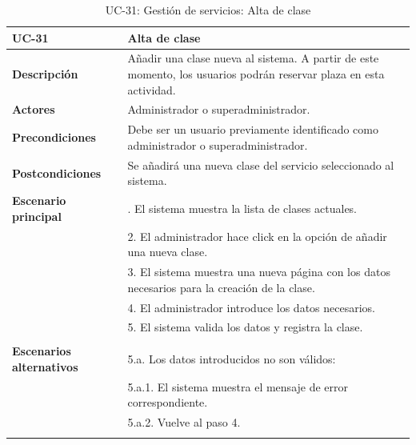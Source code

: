 \begin{table}
  \begin{center}
    \begin{tabularx}{16.4cm}{|l|X|}
      \hline
      \textbf{UC-31} & \textbf{Alta de clase}\\
      \hline
      \textbf{Descripción} & Añadir una clase nueva al sistema. A partir de este momento, los usuarios podrán reservar plaza en esta actividad.\\
      \hline
      \textbf{Actores} & Administrador o superadministrador.\\
      \hline
      \textbf{Precondiciones} & Debe ser un usuario previamente identificado como administrador o superadministrador.\\
      \hline
      \textbf{Postcondiciones} & Se añadirá una nueva clase del servicio seleccionado al sistema.\\
      \hline
      \textbf{Escenario principal} & \smallskip 1. El sistema muestra la lista de clases actuales.\\
      & 2. El administrador hace click en la opción de añadir una nueva clase.\\
      & 3. El sistema muestra una nueva página con los datos necesarios para la creación de la clase.\\
      & 4. El administrador introduce los datos necesarios.\\
      & 5. El sistema valida los datos y registra la clase.\\
      & \\
      \hline
      \textbf{Escenarios alternativos} & \smallskip 5.a. Los datos introducidos no son válidos:\\
      & \hspace{0.3cm} 5.a.1. El sistema muestra el mensaje de error correspondiente.\\
      & \hspace{0.3cm} 5.a.2. Vuelve al paso 4.\\
      & \\
      \hline
    \end{tabularx}
    \caption{UC-31: Gestión de servicios: Alta de clase}
    \label{tab:CU-alta-clase}
  \end{center}
\end{table}


